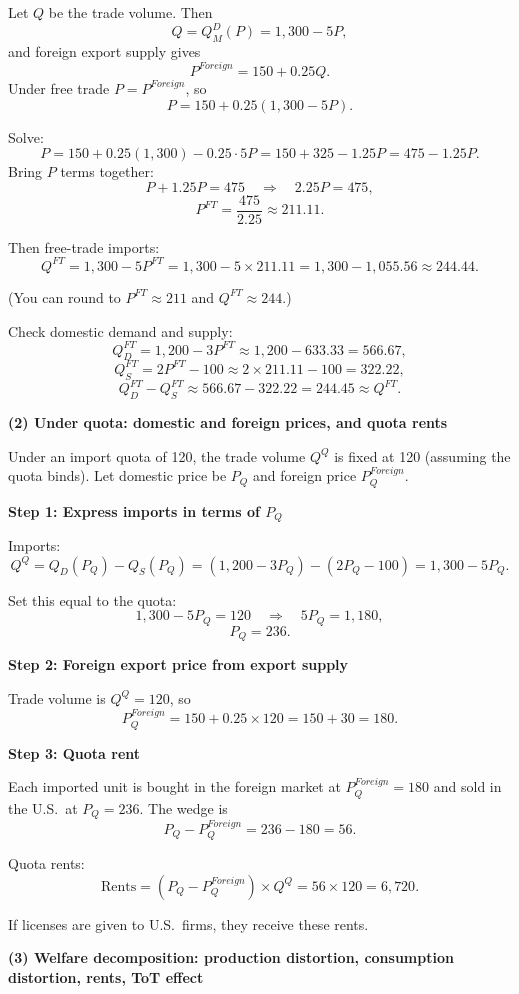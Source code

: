 \documentclass[12pt]{article}
\begin{document}
Let $Q$ be the trade volume. Then
\[
Q = Q_M^D(P) = 1{,}300 - 5P,
\]
and foreign export supply gives
\[
P^{Foreign} = 150 + 0.25Q.
\]
Under free trade $P = P^{Foreign}$, so
\[
P = 150 + 0.25(1{,}300 - 5P).
\]

Solve:
\[
P = 150 + 0.25(1{,}300) - 0.25\cdot 5P
= 150 + 325 - 1.25P
= 475 - 1.25P.
\]
Bring $P$ terms together:
\[
P + 1.25P = 475 \quad\Rightarrow\quad 2.25P = 475,
\]
\[
P^{FT} = \frac{475}{2.25} \approx 211.11.
\]

Then free-trade imports:
\[
Q^{FT} = 1{,}300 - 5P^{FT}
= 1{,}300 - 5\times 211.11
= 1{,}300 - 1{,}055.56
\approx 244.44.
\]

(You can round to $P^{FT}\approx 211$ and $Q^{FT}\approx 244$.)

Check domestic demand and supply:
\[
Q_D^{FT} = 1{,}200 - 3P^{FT} \approx 1{,}200 - 633.33 = 566.67,
\]
\[
Q_S^{FT} = 2P^{FT} - 100 \approx 2\times 211.11 - 100 = 322.22,
\]
\[
Q_D^{FT} - Q_S^{FT} \approx 566.67 - 322.22 = 244.45 \approx Q^{FT}.
\]

\textbf{(2) Under quota: domestic and foreign prices, and quota rents}

Under an import quota of 120, the trade volume $Q^Q$ is fixed at 120 (assuming the quota binds). Let domestic price be $P_Q$ and foreign price $P^{Foreign}_Q$.

\textbf{Step 1: Express imports in terms of $P_Q$}

Imports:
\[
Q^Q = Q_D(P_Q) - Q_S(P_Q)
= (1{,}200 - 3P_Q) - (2P_Q - 100)
= 1{,}300 - 5P_Q.
\]

Set this equal to the quota:
\[
1{,}300 - 5P_Q = 120 \quad\Rightarrow\quad 5P_Q = 1{,}180,
\]
\[
P_Q = 236.
\]

\textbf{Step 2: Foreign export price from export supply}

Trade volume is $Q^Q = 120$, so
\[
P^{Foreign}_Q = 150 + 0.25 \times 120
= 150 + 30 = 180.
\]

\textbf{Step 3: Quota rent}

Each imported unit is bought in the foreign market at $P^{Foreign}_Q = 180$ and sold in the U.S.\ at $P_Q = 236$. The wedge is
\[
P_Q - P^{Foreign}_Q = 236 - 180 = 56.
\]

Quota rents:
\[
\text{Rents} = (P_Q - P^{Foreign}_Q)\times Q^Q
= 56 \times 120 = 6{,}720.
\]

If licenses are given to U.S.\ firms, they receive these rents.

\textbf{(3) Welfare decomposition: production distortion, consumption distortion, rents, ToT effect}
\end{document}
